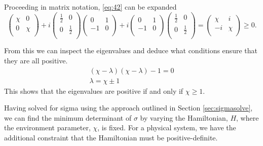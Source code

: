 \documentclass[11pt,a4paper]{article}
\numberwithin{equation}{section}
\begin{document}
	Proceeding in matrix notation, \ref{eq:42} can be expanded	
	\begin{equation*}
	\begin{pmatrix}
	\chi & 0  \\
	0 & \chi \\
	\end{pmatrix} + i\begin{pmatrix}
	\frac{1}{2} & 0  \\
	0 & \frac{1}{2} \\
	\end{pmatrix}\begin{pmatrix}
	0 & 1  \\
	-1 & 0 \\
	\end{pmatrix} + i\begin{pmatrix}
	0 & 1  \\
	-1 & 0 \\
	\end{pmatrix}\begin{pmatrix}
	\frac{1}{2} & 0  \\
	0 & \frac{1}{2} \\
	\end{pmatrix}=
	\begin{pmatrix}
	\chi & i  \\
	-i & \chi \\
	\end{pmatrix} \geq 0.
	\end{equation*}

	From this we can inspect the eigenvalues and deduce what conditions ensure that they are all positive.
	\begin{align*}
	&(\chi- \lambda)(\chi- \lambda) - 1 = 0&\\
	&\lambda = \chi \pm 1&
	\end{align*}
	This shows that the eigenvalues are positive if and only if $\chi \geq 1$.
	
	Having solved for sigma using the approach outlined in Section \ref{sec:sigmasolve}, we can find the minimum determinant of $\sigma$ by varying the Hamiltonian, $H$, where the environment parameter, $\chi$, is fixed. For a physical system, we have the additional constraint that the Hamiltonian must be positive-definite. 
	
\end{document}
